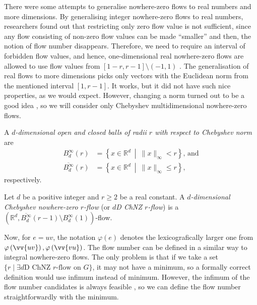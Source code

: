 There were some attempts to generalise nowhere-zero flows to real numbers and more dimensions. By generalising integer nowhere-zero flows to real numbers, researchers found out that restricting only zero flow value is not sufficient, since any flow consisting of non-zero flow values can be made ``smaller'' and then, the notion of flow number disappears. Therefore, we need to require an interval of forbidden flow values, and hence, one-dimensional real nowhere-zero flows are allowed to use flow values from $[1-r,r-1]\setminus(-1, 1)$ \cite{goddyn_fractional_nzf}. The generalisation of real flows to more dimensions \cite{euclidean_flows} picks only vectors with the Euclidean norm from the mentioned interval $[1,r-1]$. It works, but it did not have such nice properties, as we would expect. However, changing a norm turned out to be a good idea \cite{preprint}, so we will consider only Chebyshev multidimensional nowhere-zero flows.

\begin{definition}
A \emph{$d$-dimensional open and closed balls of radii $r$ with respect to Chebyshev norm} are
\begin{align*}
B_d^\infty(r) &= \left\{x\in\mathbb R^d~\middle|~\|x\|_\infty < r\right\}\text{, and}\\
\overline{B_d^\infty}(r) &= \left\{x\in\mathbb R^d~\middle|~\|x\|_\infty \leq r\right\},
\end{align*}
respectively.
\end{definition}

\begin{definition}
Let $d$ be a positive integer and $r\geq 2$ be a real constant. A \emph{$d$-dimensional Chebyshev nowhere-zero $r$-flow} (or \emph{$d$D ChNZ $r$-flow}) is a $\left(\mathbb R^d, \overline{B_d^\infty}(r-1)\setminus B_d^\infty(1)\right)$-flow.
\end{definition}

Now, for $e=uv$, the notation $\varphi(e)$ denotes the lexicografically larger one from $\varphi\left(\vv{uv}\right), \varphi\left(\vv{vu}\right)$. The flow number can be defined in a similar way to integral nowhere-zero flows. The only problem is that if we take a set $\{r\mid\exists d\text{D ChNZ }r\text{-flow on }G\}$, it may not have a minimum, so a formally correct definition would use infimum instead of minimum. However, the infimum of the flow number candidates is always feasible \cite[p. 101]{euclidean_flows}, so we can define the flow number straightforwardly with the minimum.

